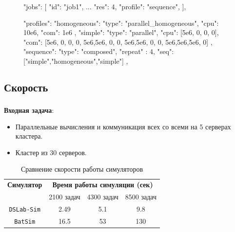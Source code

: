 \documentclass[t]{beamer}  %
\begin{document}
\begin{frame}[fragile]
	\frametitle{\insertsection} 
	\framesubtitle{\insertsubsection}
	\vspace{-0.5cm}
	\begin{figure}
		\scriptsize
	\begin{jsoncode}
"jobs": [
  {"id": "job1",  ...  "res": 4, "profile": "sequence"},
],

"profiles": {
  "homogeneous": {
    "type": "parallel_homogeneous",
    "cpu": 10e6,
    "com": 1e6
  },
  "simple": {
    "type": "parallel",
    "cpu": [5e6,  0,  0,  0],
    "com": [5e6,  0,  0,  0,
            5e6,5e6,  0,  0,
            5e6,5e6,  0,  0,
            5e6,5e6,5e6,  0]
  },
  "sequence": {
    "type": "composed",
    "repeat" : 4,
    "seq": ["simple","homogeneous","simple"]
  },
}
	\end{jsoncode}
\end{figure}
\end{frame}


\subsection{Скорость} 

\begin{frame}[fragile]
	\frametitle{\insertsection} 
	\framesubtitle{\insertsubsection}
	\vspace{0.5cm}
	\textbf{Входная задача}: 
	\begin{itemize}
		\item Параллельные вычисления и коммуникация всех со всеми на 5 серверах кластера. 
		\item Кластер из 30 серверов.
	\end{itemize} 

	\vspace{0.5cm}
	\begin{table}[H]
		\centering
		\begin{tabular}{|c|c|c|c|}
			\hline
			\textbf{Симулятор} & \multicolumn{3}{c|}{\textbf{Время работы симуляции (сек)}}    \\
			\cline{2-4}
			& 2100 задач & 4300 задач & 8500 задач \\
			\hline
			\texttt{DSLab-Sim} & 2.49 & 5.1 & 9.8 \\
			\hline
			\texttt{BatSim} &  16.5 & 53 & 130 \\
			\hline
		\end{tabular}
		\caption*{Сравнение скорости работы симуляторов}
	\end{table}
\end{frame}
\end{document}
